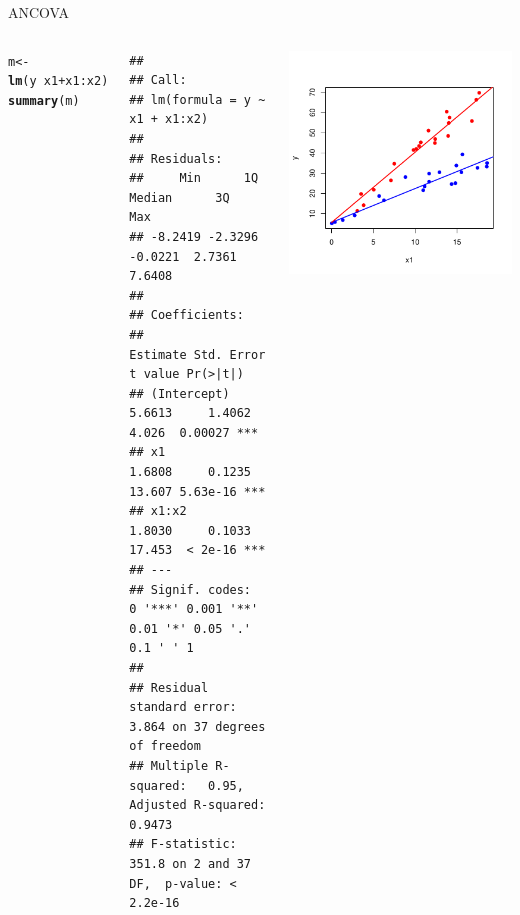 \documentclass{beamer}\usepackage[]{graphicx}\usepackage[]{color}
\makeatletter
\newcommand{\hlopt}[1]{\textcolor[rgb]{0,0,0}{#1}}%
\newcommand{\hlstd}[1]{\textcolor[rgb]{0.345,0.345,0.345}{#1}}%
\newcommand{\hlkwb}[1]{\textcolor[rgb]{0.69,0.353,0.396}{#1}}%
\newcommand{\hlkwd}[1]{\textcolor[rgb]{0.737,0.353,0.396}{\textbf{#1}}}%
\newenvironment{kframe}{%
 \def\at@end@of@kframe{}%
 \ifinner\ifhmode%
  \def\at@end@of@kframe{\end{minipage}}%
  \begin{minipage}{\columnwidth}%
 \fi\fi%
 \def\FrameCommand##1{\hskip\@totalleftmargin \hskip-\fboxsep
 \colorbox{shadecolor}{##1}\hskip-\fboxsep
     \hskip-\linewidth \hskip-\@totalleftmargin \hskip\columnwidth}%
 \MakeFramed {\advance\hsize-\width
   \@totalleftmargin\z@ \linewidth\hsize
   \@setminipage}}%
 {\par\unskip\endMakeFramed%
 \at@end@of@kframe}
\newenvironment{knitrout}{}{} %
\renewenvironment{knitrout}{\setlength{\topsep}{0mm}}{}
\makeatother
\begin{document}

\begin{frame}[fragile]{ANCOVA}

\begin{columns}

\setlength{\topsep}{2pt}
\begin{knitrout}\tiny
{}\color{fgcolor}\begin{kframe}
\begin{alltt}
\hlstd{m} \hlkwb{<-} \hlkwd{lm}\hlstd{(y} \hlopt{~} \hlstd{x1} \hlopt{+} \hlstd{x1}\hlopt{:}\hlstd{x2)}
\hlkwd{summary}\hlstd{(m)}
\end{alltt}
\begin{verbatim}
## 
## Call:
## lm(formula = y ~ x1 + x1:x2)
## 
## Residuals:
##     Min      1Q  Median      3Q     Max 
## -8.2419 -2.3296 -0.0221  2.7361  7.6408 
## 
## Coefficients:
##             Estimate Std. Error t value Pr(>|t|)    
## (Intercept)   5.6613     1.4062   4.026  0.00027 ***
## x1            1.6808     0.1235  13.607 5.63e-16 ***
## x1:x2         1.8030     0.1033  17.453  < 2e-16 ***
## ---
## Signif. codes:  0 '***' 0.001 '**' 0.01 '*' 0.05 '.' 0.1 ' ' 1
## 
## Residual standard error: 3.864 on 37 degrees of freedom
## Multiple R-squared:   0.95,	Adjusted R-squared:  0.9473 
## F-statistic: 351.8 on 2 and 37 DF,  p-value: < 2.2e-16
\end{verbatim}
\end{kframe}
\end{knitrout}


\begin{knitrout}
\color{fgcolor}
\includegraphics[width=1.1\linewidth]{figure/ancovplot5-1} 


\end{knitrout}
\end{columns}
\end{frame}
\end{document}
